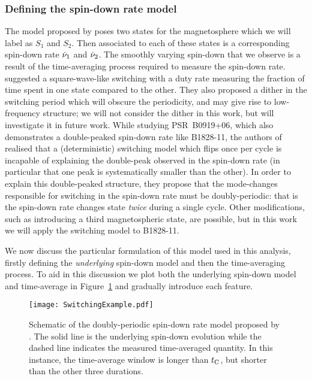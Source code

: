 \documentclass[../full_thesis/full_thesis.tex]{subfiles}
\begin{document}
\subsubsection{Defining the spin-down rate model}
\label{sec: spin-down rate}

The model proposed by \citet{Lyne2010} poses two states for the magnetosphere
which we will label as $S_{1}$ and $S_{2}$. Then associated to each of these
states is a corresponding spin-down rate $\dot{\nu}_{1}$ and $\dot{\nu}_{2}$. The
smoothly varying spin-down that we observe is a result of the time-averaging
process required to measure the spin-down rate. \citet{Lyne2010} suggested a
square-wave-like switching with a duty rate measuring the fraction of time
spent in one state compared to the other. They also proposed a dither in the
switching period which will obscure the periodicity, and may give rise to
low-frequency structure; we will not consider the dither in this work, but will
investigate it in future work. While studying PSR~B0919+06, which also
demonstrates a double-peaked spin-down rate like B1828-11, the authors of
\citet{Perera2015} realised that a (deterministic) switching model which flips
once per cycle is incapable of explaining the double-peak observed in the
spin-down rate (in particular that one peak is systematically smaller than the
other). In order to explain this double-peaked structure, they propose that the
mode-changes responsible for switching in the spin-down rate must be
doubly-periodic: that is the spin-down rate changes state \emph{twice} during a
single cycle. Other modifications, such as introducing a third magnetospheric
state, are possible, but in this work we will apply the \citet{Perera2015}
switching model to B1828-11.

We now discuss the particular formulation of this model used in this
analysis, firstly defining the \emph{underlying} spin-down model and then the
time-averaging process. To aid in this discussion we plot both the underlying
spin-down model and time-average in Figure~\ref{fig: perera illustration} and
gradually introduce each feature.
\begin{figure}
\centering \texttt{[image: SwitchingExample.pdf]}
\caption{Schematic of the doubly-periodic spin-down rate model proposed by
\citet{Perera2015}. The solid line is the underlying spin-down evolution while
the dashed line indicates the measured time-averaged quantity. In this
instance, the time-average window is longer than $t_{\mathrm{C}}$, but shorter than the
other three durations.}
\label{fig: perera illustration}
\end{figure}
\end{document}

